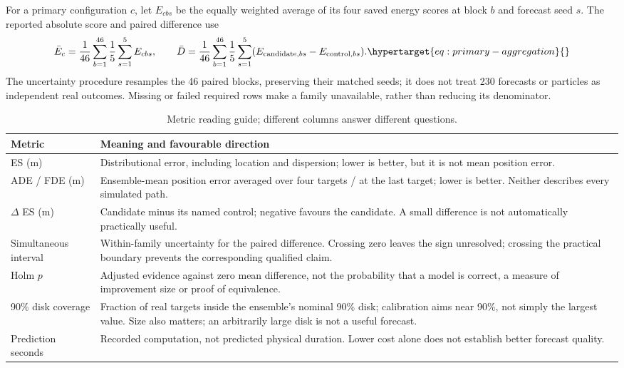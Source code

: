 For a primary configuration $c$, let $E_{cbs}$ be the equally weighted
average of its four saved energy scores at block $b$ and forecast seed $s$.
The reported absolute score and paired difference use
\begin{equation}
\bar E_c=\frac{1}{46}\sum_{b=1}^{46}\frac{1}{5}\sum_{s=1}^{5}E_{cbs},
\qquad
\bar D=\frac{1}{46}\sum_{b=1}^{46}\frac{1}{5}\sum_{s=1}^{5}
(E_{\mathrm{candidate},bs}-E_{\mathrm{control},bs}).
\label{eq:primary-aggregation}\hypertarget{eq:primary-aggregation}{}
\end{equation}
The uncertainty procedure resamples the 46 paired blocks, preserving their
matched seeds; it does not treat 230 forecasts or particles as independent
real outcomes. Missing or failed required rows make a family unavailable,
rather than reducing its denominator.

\begin{table}[htbp]
\centering\small
\caption{Metric reading guide; different columns answer different questions.}
\label{tab:metric-reader}\hypertarget{tab:metric-reader}{}
\begin{tabular}{@{}p{.22\linewidth}p{.69\linewidth}@{}}
\toprule
Metric & Meaning and favourable direction\\
\midrule
ES (m) & Distributional error, including location and dispersion; lower is better,
but it is not mean position error.\\
ADE / FDE (m) & Ensemble-mean position error averaged over four targets / at the last
target; lower is better. Neither describes every simulated path.\\
$\Delta$ ES (m) & Candidate minus its named control; negative favours the candidate.
A small difference is not automatically practically useful.\\
Simultaneous interval & Within-family uncertainty for the paired difference.
Crossing zero leaves the sign unresolved; crossing the practical boundary
prevents the corresponding qualified claim.\\
Holm $p$ & Adjusted evidence against zero mean difference, not the probability that
a model is correct, a measure of improvement size or proof of equivalence.\\
90\% disk coverage & Fraction of real targets inside the ensemble's nominal 90\%
disk; calibration aims near 90\%, not simply the largest value. Size also
matters; an arbitrarily large disk is not a useful forecast.\\
Prediction seconds & Recorded computation, not predicted physical duration.
Lower cost alone does not establish better forecast quality.\\
\bottomrule
\end{tabular}
\end{table}

